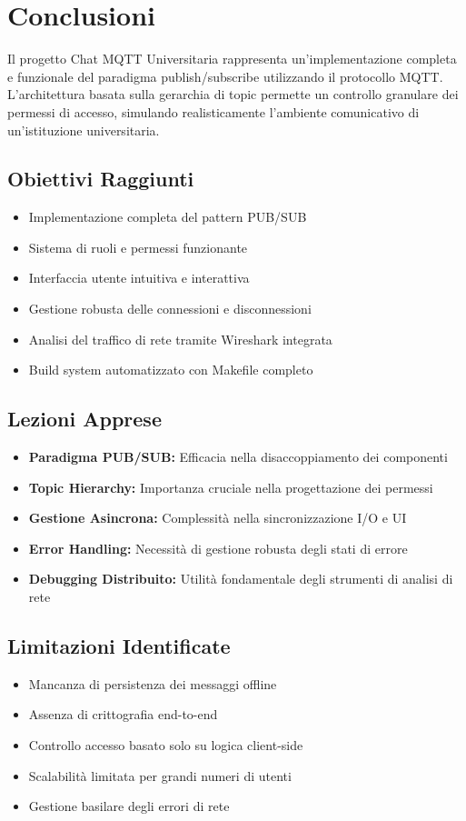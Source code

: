 \documentclass[12pt,a4paper]{article}
\begin{document}
\section{Conclusioni}

Il progetto Chat MQTT Universitaria rappresenta un'implementazione completa e funzionale del paradigma publish/subscribe utilizzando il protocollo MQTT. L'architettura basata sulla gerarchia di topic permette un controllo granulare dei permessi di accesso, simulando realisticamente l'ambiente comunicativo di un'istituzione universitaria.

\subsection{Obiettivi Raggiunti}
\begin{itemize}
    \item Implementazione completa del pattern PUB/SUB
    \item Sistema di ruoli e permessi funzionante
    \item Interfaccia utente intuitiva e interattiva
    \item Gestione robusta delle connessioni e disconnessioni
    \item Analisi del traffico di rete tramite Wireshark integrata
    \item Build system automatizzato con Makefile completo
\end{itemize}

\subsection{Lezioni Apprese}
\begin{itemize}
    \item \textbf{Paradigma PUB/SUB:} Efficacia nella disaccoppiamento dei componenti
    \item \textbf{Topic Hierarchy:} Importanza cruciale nella progettazione dei permessi
    \item \textbf{Gestione Asincrona:} Complessità nella sincronizzazione I/O e UI
    \item \textbf{Error Handling:} Necessità di gestione robusta degli stati di errore
    \item \textbf{Debugging Distribuito:} Utilità fondamentale degli strumenti di analisi di rete
\end{itemize}

\subsection{Limitazioni Identificate}
\begin{itemize}
    \item Mancanza di persistenza dei messaggi offline
    \item Assenza di crittografia end-to-end
    \item Controllo accesso basato solo su logica client-side
    \item Scalabilità limitata per grandi numeri di utenti
    \item Gestione basilare degli errori di rete
\end{itemize}
\end{document}
